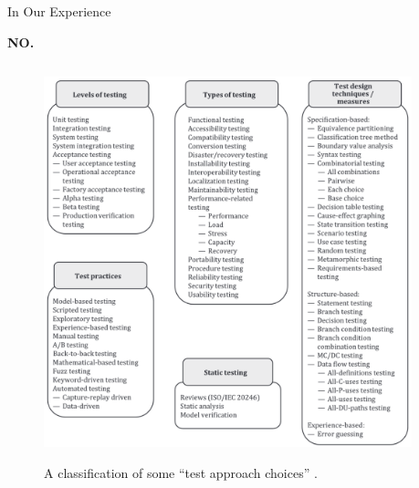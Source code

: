 \documentclass[22pt]{beamer}
\begin{document}
\begin{frame}[fragile]
\begin{textblock}{7.25}
        \begin{block}{\fontsize{37}{20}\selectfont In Our Experience}
            \vspace{5mm}
            \begin{center}
                {\fontsize{185}{20}\selectfont \textbf{NO.}}
            \end{center}
            \begin{columns}
                \begin{column}{0.7\textwidth}
                    \begin{center}
                        \begin{figure}
                            \centering
                            \includegraphics[width=\textwidth]{test approach choices.png}
                            \label{Fig:approach-choices}
                            \vspace{-5mm}
                            \caption{A classification of some ``test approach choices''
                                \cite[p.~22]{IEEE2022}.}
                        \end{figure}
                    \end{center}
                \end{column}
                \begin{column}{0.25\textwidth}

\end{column}
\end{columns}
\end{block}
\end{textblock}
\end{frame}
\end{document}
